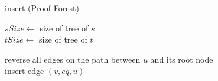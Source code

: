 \begin{algorithm}[h]
\caption[.]{insert (Proof Forest)}
	
	
	$sSize \leftarrow $ size of tree of $s$ \\ %
	$tSize \leftarrow $ size of tree of $t$ %
	

	reverse all edges on the path between $u$ and its root node \\
	insert edge $(v,eq,u)$%

  \label{algo:insert_pt}
\end{algorithm}

